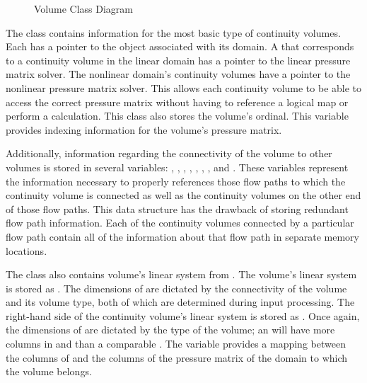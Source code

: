 \begin{figure}[ht!]
\singlespace\centering

\caption{Volume Class Diagram}
\label{fig:volumeClassDiagram}
\end{figure}

The  class contains information for the most basic type of continuity volumes.
Each  has a pointer to the  object associated with its domain.
A  that corresponds to a continuity volume in the linear domain has a  pointer to the linear pressure matrix solver.
The nonlinear domain's continuity volumes have a  pointer to the nonlinear pressure matrix solver.
This allows each continuity volume to be able to access the correct pressure matrix without having to reference a logical map or perform a calculation.
This class also stores the volume's ordinal.
This variable provides indexing information for the volume's pressure matrix.

Additionally, information regarding the connectivity of the volume to other volumes is stored in several variables: , , , , , , , and .
These variables represent the information necessary to properly references those flow paths to which the continuity volume is connected as well as the continuity volumes on the other end of those flow paths.
This data structure has the drawback of storing redundant flow path information.
Each of the continuity volumes connected by a particular flow path contain all of the information about that flow path in separate memory locations.

The  class also contains volume's linear system from .
The volume's linear system is stored as .
The dimensions of  are dictated by the connectivity of the volume and its volume type, both of which are determined during input processing.
The right-hand side of the continuity volume's linear system is stored as .
Once again, the dimensions of  are dictated by the type of the volume; an  will have more columns in  and  than a comparable .  
The variable  provides a mapping between the columns of  and the columns of the pressure matrix of the domain to which the volume belongs.

